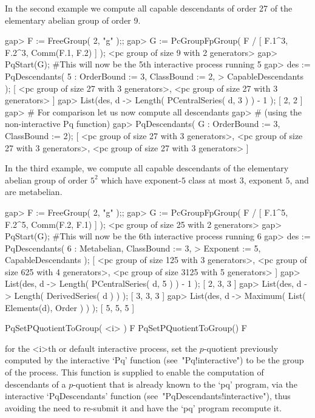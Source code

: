 In the second example we compute all  capable descendants of order  27 of
the  elementary abelian group of order 9.  

\beginexample
gap> F := FreeGroup( 2, "g" );;                                 
gap> G := PcGroupFpGroup( F / [ F.1^3, F.2^3, Comm(F.1, F.2) ] );
<pc group of size 9 with 2 generators>
gap> PqStart(G); #This will now be the 5th interactive process running
5
gap> des := PqDescendants( 5 : OrderBound := 3, ClassBound := 2,
>                              CapableDescendants );
[ <pc group of size 27 with 3 generators>, 
  <pc group of size 27 with 3 generators> ]
gap> List(des, d -> Length( PCentralSeries( d, 3 ) ) - 1 );
[ 2, 2 ]
gap> # For comparison let us now compute all descendants
gap> # (using the non-interactive Pq function)
gap> PqDescendants( G : OrderBound := 3, ClassBound := 2);
[ <pc group of size 27 with 3 generators>, 
  <pc group of size 27 with 3 generators>, 
  <pc group of size 27 with 3 generators> ]
\endexample

In  the  third  example,  we  compute  all  capable  descendants  of  the
elementary abelian group of order  $5^2$ which have exponent-$5$ class at
most $3$, exponent $5$, and are metabelian.

\beginexample
gap> F := FreeGroup( 2, "g" );;
gap> G := PcGroupFpGroup( F / [ F.1^5, F.2^5, Comm(F.2, F.1) ] );
<pc group of size 25 with 2 generators>
gap> PqStart(G); #This will now be the 6th interactive process running
6
gap> des := PqDescendants( 6 : Metabelian, ClassBound := 3,
>                              Exponent := 5, CapableDescendants );
[ <pc group of size 125 with 3 generators>, 
  <pc group of size 625 with 4 generators>, 
  <pc group of size 3125 with 5 generators> ]
gap> List(des, d -> Length( PCentralSeries( d, 5 ) ) - 1 );
[ 2, 3, 3 ]
gap> List(des, d -> Length( DerivedSeries( d ) ) );
[ 3, 3, 3 ]
gap> List(des, d -> Maximum( List( Elements(d), Order ) ) );
[ 5, 5, 5 ]
\endexample

\>PqSetPQuotientToGroup( <i> ) F
\>PqSetPQuotientToGroup() F

for  the  <i>th  or  default  interactive  {\ANUPQ}  process,   set   the
$p$-quotient  previously  computed  by  the  interactive  `Pq'   function
(see~"Pq!interactive") to be the group of the process. This  function  is
supplied to enable the computation of descendants of a $p$-quotient  that
is already known to the `pq' program, via the interactive  `PqDescendants'
function (see~"PqDescendants!interactive"), thus  avoiding  the  need  to
re-submit it and have the `pq' program recompute it.

